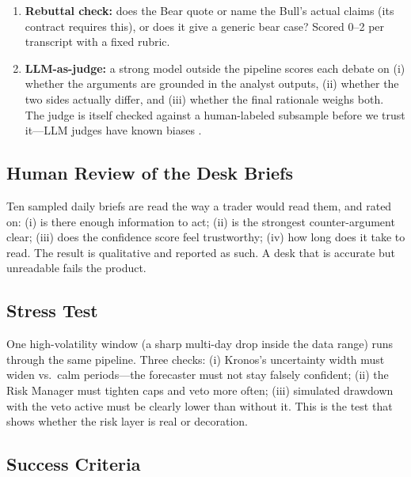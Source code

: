 \documentclass[conference]{IEEEtran}
\begin{document}
\begin{enumerate}[leftmargin=*,itemsep=1pt,topsep=2pt]
  \item \textbf{Rebuttal check:} does the Bear quote or name the Bull's actual claims (its contract requires this), or does it give a generic bear case? Scored 0--2 per transcript with a fixed rubric.
  \item \textbf{LLM-as-judge:} a strong model outside the pipeline scores each debate on (i) whether the arguments are grounded in the analyst outputs, (ii) whether the two sides actually differ, and (iii) whether the final rationale weighs both. The judge is itself checked against a human-labeled subsample before we trust it---LLM judges have known biases \cite{zheng2023judging}.
\end{enumerate}

\subsection{Human Review of the Desk Briefs}
\label{sec:eval-human}

Ten sampled daily briefs are read the way a trader would read them, and rated on: (i) is there enough information to act; (ii) is the strongest counter-argument clear; (iii) does the confidence score feel trustworthy; (iv) how long does it take to read. The result is qualitative and reported as such. A desk that is accurate but unreadable fails the product.

\subsection{Stress Test}

One high-volatility window (a sharp multi-day drop inside the data range) runs through the same pipeline. Three checks: (i) Kronos's uncertainty width must widen vs.\ calm periods---the forecaster must not stay falsely confident; (ii) the Risk Manager must tighten caps and veto more often; (iii) simulated drawdown with the veto active must be clearly lower than without it. This is the test that shows whether the risk layer is real or decoration.

\subsection{Success Criteria}
\end{document}
